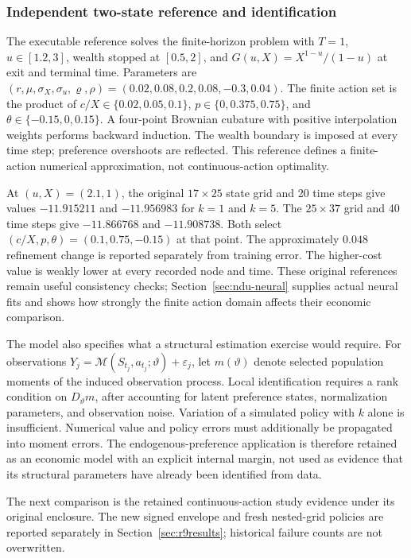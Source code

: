 \documentclass[ecta,nameyear,draft]{econsocart}
\theoremstyle{definition}
\theoremstyle{remark}
\begin{document}
\subsubsection{Independent two-state reference and identification}
The executable reference solves the finite-horizon problem with $T=1$, $u\in[1.2,3]$, wealth stopped at $[0.5,2]$, and $G(u,X)=X^{1-u}/(1-u)$ at exit and terminal time. Parameters are $(r,\mu,\sigma_X,\sigma_u,\varrho,\rho)=(0.02,0.08,0.2,0.08,-0.3,0.04)$. The finite action set is the product of $c/X\in\{0.02,0.05,0.1\}$, $p\in\{0,0.375,0.75\}$, and $\theta\in\{-0.15,0,0.15\}$. A four-point Brownian cubature with positive interpolation weights performs backward induction. The wealth boundary is imposed at every time step; preference overshoots are reflected. This reference defines a finite-action numerical approximation, not continuous-action optimality.

At $(u,X)=(2.1,1)$, the original $17\times25$ state grid and 20 time steps give values $-11.915211$ and $-11.956983$ for $k=1$ and $k=5$. The $25\times37$ grid and 40 time steps give $-11.866768$ and $-11.908738$. Both select $(c/X,p,\theta)=(0.1,0.75,-0.15)$ at that point. The approximately $0.048$ refinement change is reported separately from training error. The higher-cost value is weakly lower at every recorded node and time. These original references remain useful consistency checks; Section~\ref{sec:ndu-neural} supplies actual neural fits and shows how strongly the finite action domain affects their economic comparison.

The model also specifies what a structural estimation exercise would require. For observations $Y_j=\mathcal M(S_{t_j},a_{t_j};\vartheta)+\varepsilon_j$, let $m(\vartheta)$ denote selected population moments of the induced observation process. Local identification requires a rank condition on $D_\vartheta m$, after accounting for latent preference states, normalization parameters, and observation noise. Variation of a simulated policy with $k$ alone is insufficient. Numerical value and policy errors must additionally be propagated into moment errors. The endogenous-preference application is therefore retained as an economic model with an explicit internal margin, not used as evidence that its structural parameters have already been identified from data.

The next comparison is the retained continuous-action study evidence under its original enclosure. The new signed envelope and fresh nested-grid policies are reported separately in Section~\ref{sec:r9results}; historical failure counts are not overwritten.
\end{document}
